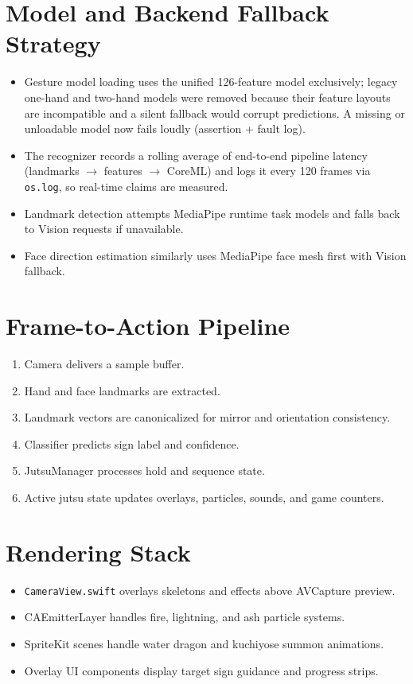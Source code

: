 \section{Model and Backend Fallback Strategy}
\begin{itemize}[leftmargin=2em]
\item Gesture model loading uses the unified 126-feature model exclusively; legacy one-hand and two-hand models were removed because their feature layouts are incompatible and a silent fallback would corrupt predictions. A missing or unloadable model now fails loudly (assertion + fault log).
\item The recognizer records a rolling average of end-to-end pipeline latency (landmarks $\rightarrow$ features $\rightarrow$ CoreML) and logs it every 120 frames via \texttt{os.log}, so real-time claims are measured.
\item Landmark detection attempts MediaPipe runtime task models and falls back to Vision requests if unavailable.
\item Face direction estimation similarly uses MediaPipe face mesh first with Vision fallback.
\end{itemize}

\section{Frame-to-Action Pipeline}
\begin{enumerate}[leftmargin=2em]
\item Camera delivers a sample buffer.
\item Hand and face landmarks are extracted.
\item Landmark vectors are canonicalized for mirror and orientation consistency.
\item Classifier predicts sign label and confidence.
\item JutsuManager processes hold and sequence state.
\item Active jutsu state updates overlays, particles, sounds, and game counters.
\end{enumerate}

\section{Rendering Stack}
\begin{itemize}[leftmargin=2em]
\item \texttt{CameraView.swift} overlays skeletons and effects above AVCapture preview.
\item CAEmitterLayer handles fire, lightning, and ash particle systems.
\item SpriteKit scenes handle water dragon and kuchiyose summon animations.
\item Overlay UI components display target sign guidance and progress strips.
\end{itemize}

